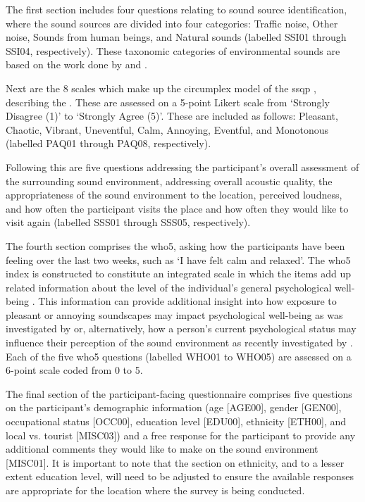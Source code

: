    The first section includes four questions relating to sound source identification, where the sound sources are divided into four categories: Traffic noise, Other noise, Sounds from human beings, and Natural sounds (labelled SSI01 through SSI04, respectively). These taxonomic categories of environmental sounds are based on the work done by \citet{Guastavino2007Categorization} and \citet{Brown2011Towards}.

   Next are the 8 scales which make up the circumplex model of the \gls{ssqp} \citep{Axelsson2012Swedish}, describing the . These are assessed on a 5-point Likert scale from `Strongly Disagree (1)' to `Strongly Agree (5)'. These are included as follows: Pleasant, Chaotic, Vibrant, Uneventful, Calm, Annoying, Eventful, and Monotonous (labelled PAQ01 through PAQ08, respectively).

   Following this are five questions addressing the participant's overall assessment of the surrounding sound environment, addressing overall acoustic quality, the appropriateness of the sound environment to the location, perceived loudness, and how often the participant visits the place and how often they would like to visit again (labelled SSS01 through SSS05, respectively).

   The fourth section comprises the \gls{who5}, asking how the participants have been feeling over the last two weeks, such as `I have felt calm and relaxed'. The \gls{who5} index is constructed to constitute an integrated scale in which the items add up related information about the level of the individual's general psychological well-being \citep{Topp2015WHO,Hall2011Examining}. This information can provide additional insight into how exposure to pleasant or annoying soundscapes may impact psychological well-being as was investigated by \citet{Aletta2019Associations} or, alternatively, how a person's current psychological status may influence their perception of the sound environment as recently investigated by \citet{Erfanian2021Psychological}. Each of the five \gls{who5} questions (labelled WHO01 to WHO05) are assessed on a 6-point scale coded from 0 to 5.

   The final section of the participant-facing questionnaire comprises five questions on the participant's demographic information (age [AGE00], gender [GEN00], occupational status [OCC00], education level [EDU00], ethnicity [ETH00], and local vs. tourist [MISC03]) and a free response for the participant to provide any additional comments they would like to make on the sound environment [MISC01]. It is important to note that the section on ethnicity, and to a lesser extent education level, will need to be adjusted to ensure the available responses are appropriate for the location where the survey is being conducted.

